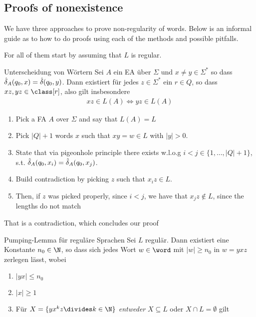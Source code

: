 


\subsection{Proofs of nonexistence}
We have three approaches to prove non-regularity of words.
Below is an informal guide as to how to do proofs using each of the methods and possible pitfalls.

For all of them start by assuming that $L$ is regular.

\begin{lemma}[]{Unterscheidung von Wörtern}
    Sei $A$ ein EA über $\Sigma$ und $x \neq y \in \Sigma^*$ so dass $\hat{\delta}_A (q_0, x) = \hat{\delta}(q_0, y)$.
    Dann existiert für jedes $z \in \Sigma^*$ ein $r \in Q$, so dass $xz, yz \in \class[r]$, also gilt insbesondere
    \rmvspace
    \begin{align*}
        xz \in L(A) \Longleftrightarrow yz \in L(A)
    \end{align*}
\end{lemma}
\begin{enumerate}[noitemsep]
    \item Pick a FA $A$ over $\Sigma$ and say that $L(A) = L$
    \item Pick $|Q| + 1$ words $x$ such that $xy = w \in L$ with $|y| > 0$.
    \item State that via pigeonhole principle there exists w.l.o.g $i < j \in \{ 1, \ldots, |Q| + 1 \}$, s.t. $\hat{\delta}_A(q_0, x_i) = \hat{\delta}_A(q_0, x_j)$.
    \item Build contradiction by picking $z$ such that $x_i z \in L$.
    \item Then, if $z$ was picked properly, since $i < j$, we have that $x_j z \notin L$, since the lengths do not match
\end{enumerate}

\rmvspace
That is a contradiction, which concludes our proof


\begin{lemma}[]{Pumping-Lemma für reguläre Sprachen}
    Sei $L$ regulär. Dann existiert eine Konstante $n_0 \in \N$, so dass sich jedes Wort $w \in \word$ mit $|w| \geq n_0$ in $w = yxz$ zerlegen lässt, wobei
    \rmvspace
    \begin{multicols}{2}
        \begin{enumerate}[label=\textit{(\roman*)}]
            \item $|yx| \leq n_0$
            \item $|x| \geq 1$
            \item Für $X = \{ yx^kz \divides k\in \N \}$ \textit{entweder} $X \subseteq L$ oder $X \cap L = \emptyset$ gilt
        \end{enumerate}
    \end{multicols}
\end{lemma}

